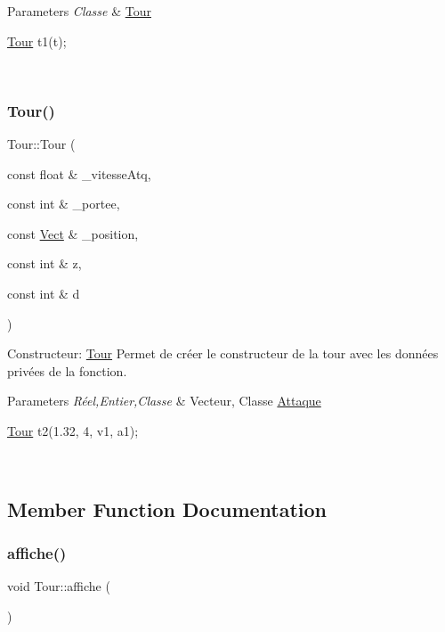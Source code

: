 \begin{DoxyParams}{Parameters}
{\em Classe} & \hyperlink{classTour}{Tour} 
\begin{DoxyCode}
\hyperlink{classTour}{Tour} t1(t);
\end{DoxyCode}
 \\
\hline
\end{DoxyParams}
\mbox{\label{classTour_abb21d80605aacb220f1ab7ac92119ce4}} 
\subsubsection{\texorpdfstring{Tour()}{Tour()}\hspace{0.1cm}{\footnotesize\ttfamily [3/3]}}
{\footnotesize\ttfamily Tour\+::\+Tour (\begin{DoxyParamCaption}\item[{const float \&}]{\+\_\+vitesse\+Atq,  }\item[{const int \&}]{\+\_\+portee,  }\item[{const \hyperlink{classVect}{Vect} \&}]{\+\_\+position,  }\item[{const int \&}]{z,  }\item[{const int \&}]{d }\end{DoxyParamCaption})}



Constructeur\+: \hyperlink{classTour}{Tour} Permet de créer le constructeur de la tour avec les données privées de la fonction. 


\begin{DoxyParams}{Parameters}
{\em Réel,Entier,Classe} & Vecteur, Classe \hyperlink{classAttaque}{Attaque} 
\begin{DoxyCode}
\hyperlink{classTour}{Tour} t2(1.32, 4, v1, a1);
\end{DoxyCode}
 \\
\hline
\end{DoxyParams}


\subsection{Member Function Documentation}
\mbox{\label{classTour_a418908de2fcbb83e8e9459a999f98aa6}} 
\subsubsection{\texorpdfstring{affiche()}{affiche()}}
{\footnotesize\ttfamily void Tour\+::affiche (\begin{DoxyParamCaption}{ }\end{DoxyParamCaption})}



